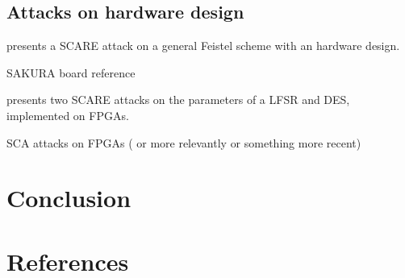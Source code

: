 \documentclass[11pt]{sdm}
\begin{document}


\subsection{Attacks on hardware design}

\parencite{Réal_Dubois_Guilloux_Valette_Drissi_2008} presents a SCARE attack on a general Feistel scheme with an hardware design.

SAKURA board reference

\parencite{Guilley_Sauvage_Micolod_Réal_Valette_2010} presents two SCARE attacks on the parameters of a LFSR and DES, implemented on FPGAs.

SCA attacks on FPGAs (\parencite{Peeters_Standaert_Donckers_Quisquater_2005} or more relevantly \parencite{Standaert_Ors_Preneel_2004} or something more recent)


\section{Conclusion}

\section*{References}

\printbibliography
\end{document}
